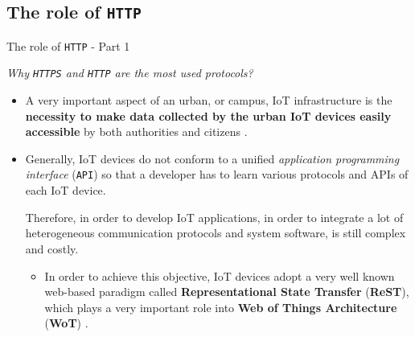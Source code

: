 \documentclass[10pt]{beamer}
\begin{document}
\subsection{The role of \texttt{HTTP}}
\begin{frame}{The role of \texttt{HTTP} - Part 1}

\begin{alertblock}{}
\textit{Why \texttt{HTTPS} and \texttt{HTTP} are the most used protocols?}
\end{alertblock}

\begin{itemize}
\justifying
\item A very important aspect of an urban, or campus, IoT infrastructure is the \textbf{necessity to make data collected by the urban IoT devices easily accessible} by both authorities and citizens \cite{IOTCITY}. 

\item Generally, IoT devices do not conform to a unified \textit{application programming interface} (\texttt{API}) so that a developer has to learn various protocols and APIs of each IoT device. 

Therefore, in order to develop IoT applications, in order to integrate a lot of heterogeneous communication protocols and system software, is still complex and costly. 

\begin{itemize}
\justifying
\item In order to achieve this objective, IoT devices adopt a very well known web-based paradigm called  \textbf{Representational State Transfer} (\textbf{ReST}), which plays a very important role into \textbf{Web of Things Architecture} (\textbf{WoT}) \cite{IOTCITY}\cite{WOT}.
\end{itemize}
\end{itemize}

\end{frame} 
\end{document}
